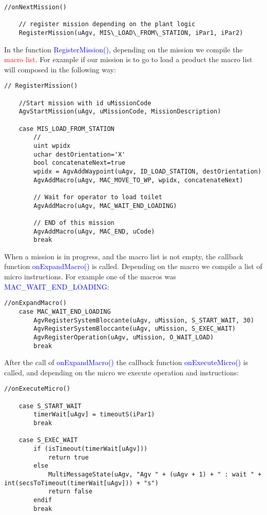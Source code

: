 \begin{lstlisting}[caption=onNextMission() missions are assigned]
	//onNextMission()
	
	// register mission depending on the plant logic
	RegisterMission(uAgv, MIS\_LOAD\_FROM\_STATION, iPar1, iPar2)
\end{lstlisting}

In the function \textcolor{blue}{RegisterMission()}, depending on the mission we compile the \textcolor{red}{macro list}. For example if our mission is to go to load a product the macro list will composed in the following way:
\begin{lstlisting}[caption=RegisterMission() macro list is composed]
	// RegisterMission()
	
	//Start mission with id uMissionCode
	AgvStartMission(uAgv, uMissionCode, MissionDescription)

	case MIS_LOAD_FROM_STATION
		//
		uint wpidx
		uchar destOrientation='X'
		bool concatenateNext=true
		wpidx = AgvAddWaypoint(uAgv, ID_LOAD_STATION, destOrientation)
		AgvAddMacro(uAgv, MAC_MOVE_TO_WP, wpidx, concatenateNext)
		
		// Wait for operator to load toilet
		AgvAddMacro(uAgv, MAC_WAIT_END_LOADING)
		
		// END of this mission
		AgvAddMacro(uAgv, MAC_END, uCode)
		break
\end{lstlisting}

When a mission is in progress, and the macro list is not empty, the callback function \textcolor{blue}{onExpandMacro()} is called. Depending on the macro we compile a list of micro instructions. For example one of the macros was \textcolor{blue}{MAC\_WAIT\_END\_LOADING}:

\begin{lstlisting}[caption= onExpandMacro() micro list is composed]
	//onExpandMacro()
	case MAC_WAIT_END_LOADING
		AgvRegisterSystemBloccante(uAgv, uMission, S_START_WAIT, 30)
		AgvRegisterSystemBloccante(uAgv, uMission, S_EXEC_WAIT)
		AgvRegisterOperation(uAgv, uMission, O_WAIT_LOAD)
		break
\end{lstlisting}

After the call of \textcolor{blue}{onExpandMacro()} the callback function \textcolor{blue}{onExecuteMicro()} is called, and depending on the micro we execute operation and instructions:

\begin{lstlisting}[caption=onExecuteMicro() micro are aexecuted]
	//onExecuteMicro()
	
	case S_START_WAIT
		timerWait[uAgv] = timeoutS(iPar1)
		break
	
	case S_EXEC_WAIT
		if (isTimeout(timerWait[uAgv]))
			return true
		else
			MultiMessageState(uAgv, "Agv " + (uAgv + 1) + " : wait " + int(secsToTimeout(timerWait[uAgv])) + "s")
			return false
		endif
		break
\end{lstlisting}

